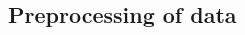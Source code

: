 \documentclass[%
	11pt,%
	a4paper,%
	onside,%
	headinclude,%
	footinclude,%
	BCOR5mm,%
	captions=tableheading]%
		{scrartcl}
\begin{document}
\begin{multicols}{2}


\section{Preprocessing of data}



%
%


% 
% 



\end{multicols}
\end{document}
